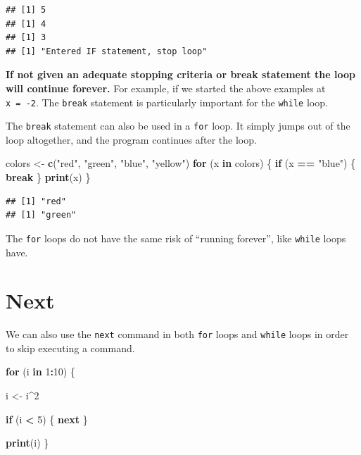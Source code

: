 \documentclass[
]{book}
\newenvironment{Shaded}{\begin{snugshade}}{\end{snugshade}}
\newcommand{\ControlFlowTok}[1]{\textcolor[rgb]{0.13,0.29,0.53}{\textbf{#1}}}
\newcommand{\DecValTok}[1]{\textcolor[rgb]{0.00,0.00,0.81}{#1}}
\newcommand{\KeywordTok}[1]{\textcolor[rgb]{0.13,0.29,0.53}{\textbf{#1}}}
\newcommand{\NormalTok}[1]{#1}
\newcommand{\OperatorTok}[1]{\textcolor[rgb]{0.81,0.36,0.00}{\textbf{#1}}}
\newcommand{\StringTok}[1]{\textcolor[rgb]{0.31,0.60,0.02}{#1}}
\begin{document}
\begin{verbatim}
## [1] 5
## [1] 4
## [1] 3
## [1] "Entered IF statement, stop loop"
\end{verbatim}

\textbf{If not given an adequate stopping criteria or break statement the loop will continue forever.} For example, if we started the above examples at \texttt{x\ =\ -2}. The \texttt{break} statement is particularly important for the \texttt{while} loop.

The \texttt{break} statement can also be used in a \texttt{for} loop. It simply jumps out of the loop altogether, and the program continues after the loop.

\begin{Shaded}
\begin{Highlighting}[]
\NormalTok{colors <-}\StringTok{ }\KeywordTok{c}\NormalTok{(}\StringTok{"red"}\NormalTok{, }\StringTok{"green"}\NormalTok{,}
    \StringTok{"blue"}\NormalTok{, }\StringTok{"yellow"}\NormalTok{)}
\ControlFlowTok{for}\NormalTok{ (x }\ControlFlowTok{in}\NormalTok{ colors) \{}
    \ControlFlowTok{if}\NormalTok{ (x }\OperatorTok{==}\StringTok{ "blue"}\NormalTok{) \{}
        \ControlFlowTok{break}
\NormalTok{    \}}
    \KeywordTok{print}\NormalTok{(x)}
\NormalTok{\}}
\end{Highlighting}
\end{Shaded}

\begin{verbatim}
## [1] "red"
## [1] "green"
\end{verbatim}

The \texttt{for} loops do not have the same risk of ``running forever'', like \texttt{while} loops have.

\hypertarget{next}{%
\section{Next}\label{next}}

We can also use the \texttt{next} command in both \texttt{for} loops and \texttt{while} loops in order to skip executing a command.

\begin{Shaded}
\begin{Highlighting}[]
\ControlFlowTok{for}\NormalTok{ (i }\ControlFlowTok{in} \DecValTok{1}\OperatorTok{:}\DecValTok{10}\NormalTok{) \{}

\NormalTok{    i <-}\StringTok{ }\NormalTok{i}\OperatorTok{^}\DecValTok{2}

    \ControlFlowTok{if}\NormalTok{ (i }\OperatorTok{<}\StringTok{ }\DecValTok{5}\NormalTok{) \{}
        \ControlFlowTok{next}
\NormalTok{    \}}

    \KeywordTok{print}\NormalTok{(i)}
\NormalTok{\}}
\end{Highlighting}
\end{Shaded}
\end{document}
